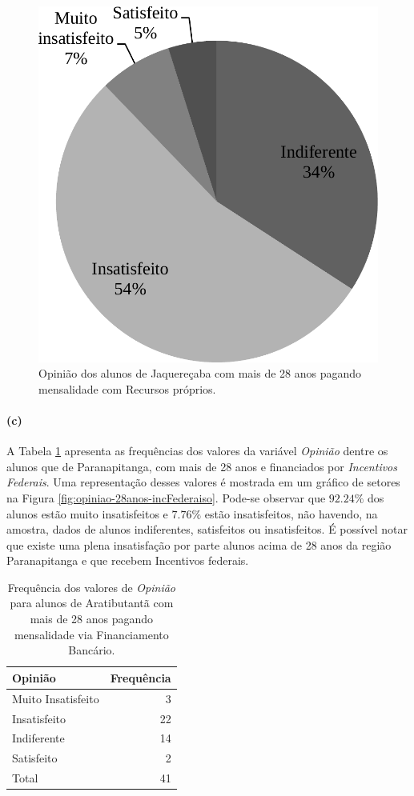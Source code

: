 \documentclass[10pt,a4paper,oneside]{article}
\newcommand{\arat}{Aratibutantã\xspace}
\newcommand{\jaqu}{Jaquereçaba\xspace}
\newcommand{\para}{Paranapitanga\xspace}
\begin{document}
\begin{figure}[!h]
	\centering
	\includegraphics[width=.4\linewidth]{plots/q17b.pdf}
	\caption{Opinião dos alunos de \jaqu com mais de 28 anos pagando mensalidade com Recursos próprios.}
	\label{fig:opiniao-28anos-proprios}
\end{figure}

\paragraph{(c)}

A Tabela \ref{table:opiniao-28anos-incFederais} apresenta as frequências dos valores da variável \textit{Opinião} dentre os alunos que de \para, com mais de 28 anos e financiados por \textit{Incentivos Federais}. Uma representação desses valores é mostrada em um gráfico de setores na Figura \ref{fig:opiniao-28anos-incFederaiso}.
Pode-se observar que $92.24\%$ dos alunos estão muito insatisfeitos e $7.76\%$ estão insatisfeitos, não havendo, na amostra, dados de alunos indiferentes, satisfeitos ou insatisfeitos.
É possível notar que existe uma plena insatisfação por parte alunos acima de 28 anos da região \para e que recebem Incentivos federais.

\begin{table}[!h]
	\small
	\centering
	\caption{Frequência dos valores de \textit{Opinião} para alunos de \arat com mais de 28 anos pagando mensalidade via Financiamento Bancário.}
	\label{table:opiniao-28anos-incFederais}
	\begin{tabular}{l r}
		\toprule
		\textbf{Opinião}    & \textbf{Frequência} \\
		\midrule
		Muito Insatisfeito  &  3  \\
		Insatisfeito        &  22 \\
		Indiferente         &  14 \\
		Satisfeito          &  2  \\
		\midrule
		Total               &  41 \\
		\bottomrule
	\end{tabular}
\end{table}
\end{document}
